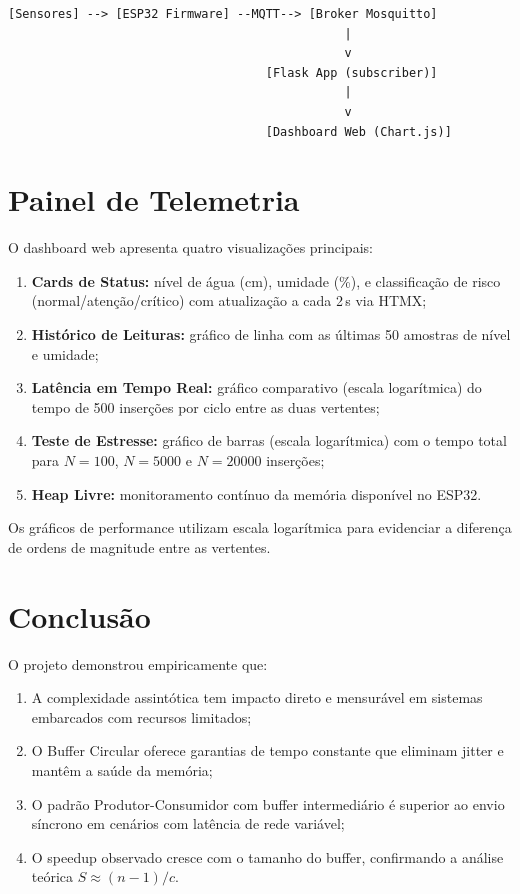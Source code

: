 \documentclass[12pt, a4paper]{article}
\begin{document}
\begin{verbatim}
[Sensores] --> [ESP32 Firmware] --MQTT--> [Broker Mosquitto]
                                               |
                                               v
                                    [Flask App (subscriber)]
                                               |
                                               v
                                    [Dashboard Web (Chart.js)]
\end{verbatim}

\section{Painel de Telemetria}

O dashboard web apresenta quatro visualizações principais:

\begin{enumerate}
    \item \textbf{Cards de Status:} nível de água (cm), umidade (\%), e classificação de risco (normal/atenção/crítico) com atualização a cada 2\,s via HTMX;
    \item \textbf{Histórico de Leituras:} gráfico de linha com as últimas 50 amostras de nível e umidade;
    \item \textbf{Latência em Tempo Real:} gráfico comparativo (escala logarítmica) do tempo de 500 inserções por ciclo entre as duas vertentes;
    \item \textbf{Teste de Estresse:} gráfico de barras (escala logarítmica) com o tempo total para $N = 100$, $N = 5000$ e $N = 20000$ inserções;
    \item \textbf{Heap Livre:} monitoramento contínuo da memória disponível no ESP32.
\end{enumerate}

Os gráficos de performance utilizam escala logarítmica para evidenciar a diferença de ordens de magnitude entre as vertentes.

\section{Conclusão}

O projeto demonstrou empiricamente que:

\begin{enumerate}
    \item A complexidade assintótica tem impacto direto e mensurável em sistemas embarcados com recursos limitados;
    \item O Buffer Circular oferece garantias de tempo constante que eliminam jitter e mantêm a saúde da memória;
    \item O padrão Produtor-Consumidor com buffer intermediário é superior ao envio síncrono em cenários com latência de rede variável;
    \item O speedup observado cresce com o tamanho do buffer, confirmando a análise teórica $S \approx (n-1)/c$.
\end{enumerate}
\end{document}

